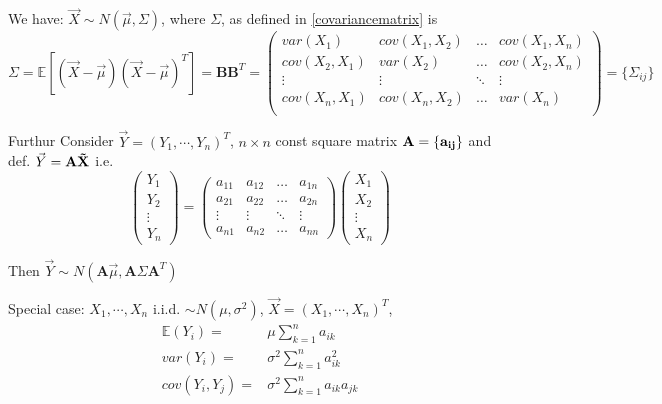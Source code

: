     
    We have: $\vec{X}\sim N(\vec{\mu},\Sigma)$, where $\Sigma$, as defined in \autoref{covariancematrix} is
    \begin{equation}
        \Sigma=\mathbb{E}[(\vec{X}-\vec{\mu})(\vec{X}-\vec{\mu})^T]=\bm{BB}^T=
        \begin{pmatrix}
        var(X_1) & cov(X_1,X_2) & \ldots & cov(X_1,X_n)\\
        cov(X_2,X_1) & var(X_2) & \ldots & cov(X_2,X_n)\\
        \vdots & \vdots & \ddots & \vdots\\
        cov(X_n,X_1) & cov(X_n,X_2) & \ldots & var(X_n)\\
        \end{pmatrix}  
        =\{\Sigma_{ij}\}  
    \end{equation}

    Furthur Consider $\vec{Y}=(Y_1,\cdots,Y_n)^T$, $n\times n$ const square matrix $\bf{A}=\{a_{ij}\}$ and def. $\vec{Y}=\bf{A}\vec{X}$ i.e.
    \begin{equation}
        \begin{pmatrix}
            Y_1\\
            Y_2\\
            \vdots\\
            Y_n
        \end{pmatrix}
        =
        \begin{pmatrix}
            a_{11}&a_{12}&\ldots&a_{1n}\\
            a_{21}&a_{22}&\ldots&a_{2n}\\
            \vdots&\vdots&\ddots&\vdots\\
            a_{n1}&a_{n2}&\ldots&a_{nn}
        \end{pmatrix}
        \begin{pmatrix}
            X_1\\
            X_2\\
            \vdots\\
            X_n
        \end{pmatrix}
    \end{equation}

    Then $\vec{Y}\sim N(\bm{A}\vec{\mu},\bm{A}\Sigma\bm{A}^T)$

    Special case: $X_1,\cdots,X_n$ i.i.d. $\sim N(\mu,\sigma^2)$, $\vec{X}=(X_1,\cdots,X_n)^T$, 
    \begin{align}
        \mathbb{E}(Y_i)=&\mu\sum_{k=1}^n a_{ik}\\
        var(Y_i)=&\sigma^2\sum_{k=1}^n a_{ik}^2\\
        cov(Y_i,Y_j)=&\sigma^2\sum_{k=1}^n a_{ik} a_{jk}
    \end{align}

